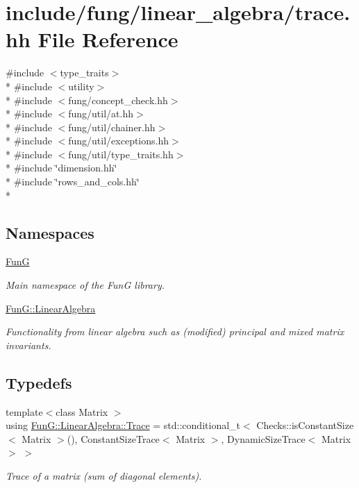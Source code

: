 \hypertarget{trace_8hh}{\section{include/fung/linear\-\_\-algebra/trace.hh File Reference}
\label{trace_8hh}
}
{\ttfamily \#include $<$type\-\_\-traits$>$}\\*
{\ttfamily \#include $<$utility$>$}\\*
{\ttfamily \#include $<$fung/concept\-\_\-check.\-hh$>$}\\*
{\ttfamily \#include $<$fung/util/at.\-hh$>$}\\*
{\ttfamily \#include $<$fung/util/chainer.\-hh$>$}\\*
{\ttfamily \#include $<$fung/util/exceptions.\-hh$>$}\\*
{\ttfamily \#include $<$fung/util/type\-\_\-traits.\-hh$>$}\\*
{\ttfamily \#include \char`\"{}dimension.\-hh\char`\"{}}\\*
{\ttfamily \#include \char`\"{}rows\-\_\-and\-\_\-cols.\-hh\char`\"{}}\\*
\subsection*{Namespaces}
\begin{DoxyCompactItemize}
\item 
\hyperlink{namespaceFunG}{Fun\-G}
\begin{DoxyCompactList}\small\item\em Main namespace of the Fun\-G library. \end{DoxyCompactList}\item 
\hyperlink{namespaceFunG_1_1LinearAlgebra}{Fun\-G\-::\-Linear\-Algebra}
\begin{DoxyCompactList}\small\item\em Functionality from linear algebra such as (modified) principal and mixed matrix invariants. \end{DoxyCompactList}\end{DoxyCompactItemize}
\subsection*{Typedefs}
\begin{DoxyCompactItemize}
\item 
{\footnotesize template$<$class Matrix $>$ }\\using \hyperlink{group__LinearAlgebraGroup_ga43e327309edc349c75ceecd29b7abde2}{Fun\-G\-::\-Linear\-Algebra\-::\-Trace} = std\-::conditional\-\_\-t$<$ Checks\-::is\-Constant\-Size$<$ Matrix $>$(), Constant\-Size\-Trace$<$ Matrix $>$, Dynamic\-Size\-Trace$<$ Matrix $>$ $>$
\begin{DoxyCompactList}\small\item\em Trace of a matrix (sum of diagonal elements). \end{DoxyCompactList}\end{DoxyCompactItemize}

